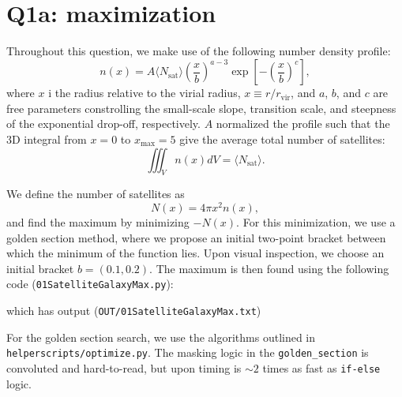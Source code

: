 \section{Q1a: maximization}
Throughout this question, we make use of the following number density profile:
\begin{equation}
	n(x) = A\langle N_\text{sat}\rangle \left(\frac{x}{b}\right)^{a-3} \exp\left[-\left(\frac{x}{b}\right)^c\right],
\end{equation}
where $x$ i the radius relative to the virial radius, $x\equiv r/r_\text{vir}$, and $a$, $b$, and $c$ are free parameters constrolling the small-scale slope, transition scale, and steepness of the exponential drop-off, respectively. $A$ normalized the profile such that the 3D integral from $x=0$ to $x_\text{max}=5$ give the average total number of satellites:
\begin{equation}
	\iiint_V n(x)dV = \langle N_\text{sat}\rangle.
	\label{eq:Nsat}
\end{equation}

We define the number of satellites as
\begin{equation}
    N(x) = 4\pi x^2 n(x),
    \label{eq:N_of_x}
\end{equation}
and find the maximum by minimizing $-N(x)$. For this minimization, we use a golden section method, where we propose an initial two-point bracket between which the minimum of the function lies. Upon visual inspection, we choose an initial bracket $b=(0.1, 0.2)$. The maximum is then found using the following code (\verb|01SatelliteGalaxyMax.py|):


which has output (\verb|OUT/01SatelliteGalaxyMax.txt|)

For the golden section search, we use the algorithms outlined in \verb|helperscripts/optimize.py|. The masking logic in the \verb|golden_section| is convoluted and hard-to-read, but upon timing is $\sim2$ times as fast as \verb|if-else| logic.
